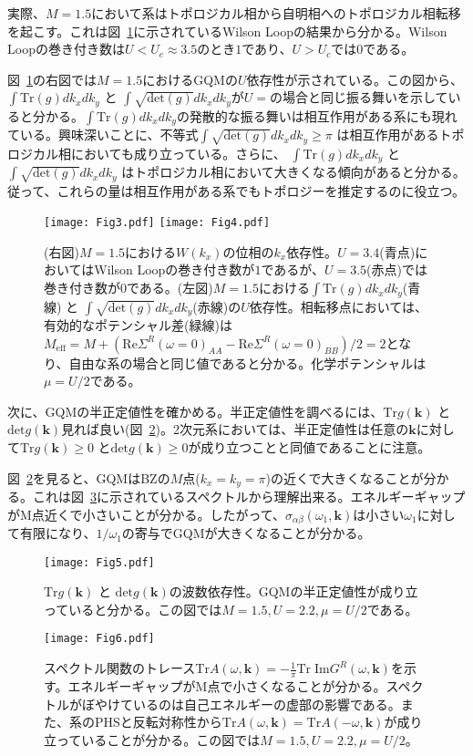 \documentclass[12pt]{jsbook}
\newcommand{\bk}{\bm{k}}
\newcommand{\trg}{\int \mathrm{Tr}(g)dk_xdk_y}
\newcommand{\detg}{\int \sqrt{\mathrm{det}(g)}dk_xdk_y}
\begin{document}
実際、$M=1.5$において系はトポロジカル相から自明相へのトポロジカル相転移を起こす。これは図~\ref{fig:M=1.5_Wilson_GQM}に示されているWilson Loopの結果から分かる。Wilson Loopの巻き付き数は$U < U_c \approx 3.5$のとき$1$であり、$U > U_c$では$0$である。

図~\ref{fig:M=1.5_Wilson_GQM}の右図では$M=1.5$におけるGQMの$U$依存性が示されている。この図から、$\int \mathrm{Tr}(g)dk_xdk_y$ と $\int \sqrt{\mathrm{det}(g)}dk_xdk_y$が$U=$の場合と同じ振る舞いを示していると分かる。$\trg$の発散的な振る舞いは相互作用がある系にも現れている。興味深いことに、不等式$\detg \geq \pi$ は相互作用があるトポロジカル相においても成り立っている。さらに、 $\int \mathrm{Tr}(g)dk_xdk_y$ と $\int \sqrt{\mathrm{det}(g)}dk_xdk_y$ はトポロジカル相において大きくなる傾向があると分かる。従って、これらの量は相互作用がある系でもトポロジーを推定するのに役立つ。 
\begin{figure}
\centering
\texttt{[image: Fig3.pdf]}
\texttt{[image: Fig4.pdf]}
\caption{(右図)$M=1.5$における$W(k_x)$の位相の$k_x$依存性。$U=3.4$(青点)においてはWilson Loopの巻き付き数が$1$であるが、$U=3.5$(赤点)では巻き付き数が$0$である。(左図)$M=1.5$における$\trg$(青線) と $\detg$(赤線)の$U$依存性。相転移点においては、有効的なポテンシャル差(緑線)は$M_{\mathrm{eff}} = M+(\mathrm{Re}\Sigma^R(\omega = 0)_{AA}-\mathrm{Re}\Sigma^R(\omega = 0)_{BB})/2 = 2$となり、自由な系の場合と同じ値であると分かる。化学ポテンシャルは$\mu = U/2$である。}
\label{fig:M=1.5_Wilson_GQM}
\end{figure}

次に、GQMの半正定値性を確かめる。半正定値性を調べるには、$\mathrm{Tr}g(\bk)$ と $\mathrm{det}g(\bk)$見れば良い(図~\ref{fig:trmapM=1.5})。2次元系においては、半正定値性は任意の$\bk$に対して$\mathrm{Tr}g(\bk) \geq 0$ と$\mathrm{det}g(\bk)\geq 0$が成り立つことと同値であることに注意。

図~\ref{fig:trmapM=1.5}を見ると、GQMはBZの$M$点($k_x = k_y = \pi$)の近くで大きくなることが分かる。これは図~\ref{fig:spectral}に示されているスペクトルから理解出来る。エネルギーギャップが$\mathrm{M}$点近くで小さいことが分かる。したがって、$\sigma_{\alpha\beta}(\omega_1,\bk)$は小さい$\omega_1$に対して有限になり、$1/\omega_1$の寄与でGQMが大きくなることが分かる。
\begin{figure}
\centering
\texttt{[image: Fig5.pdf]}
\caption{$\mathrm{Tr}g(\bk)$ と $\mathrm{det}g(\bk)$の波数依存性。GQMの半正定値性が成り立っていると分かる。この図では$M=1.5,U=2.2,\mu = U/2$である。}
\label{fig:trmapM=1.5}
\end{figure}
\begin{figure}
\centering
\texttt{[image: Fig6.pdf]}
\caption{スペクトル関数のトレース$\mathrm{Tr}A(\omega,\bk)=-\frac{1}{\pi}\text{Tr}\;\text{Im}G^R(\omega,\bk)$を示す。エネルギーギャップが$\mathrm{M}$点で小さくなることが分かる。スペクトルがぼやけているのは自己エネルギーの虚部の影響である。また、系のPHSと反転対称性から$\mathrm{Tr}A(\omega,\bk)= \mathrm{Tr}A(-\omega,\bk)$が成り立っていることが分かる。この図では$M=1.5,U=2.2,\mu = U/2$。}
\label{fig:spectral}
\end{figure}
\end{document}
